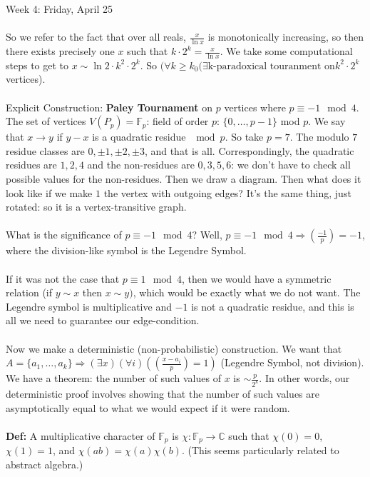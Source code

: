 \documentclass[12pt]{article}
\theoremstyle{remark}
\newcommand{\C}{\mathbb{C}}
\begin{document}
\begin{section}{Week 4: Friday, April 25}
\\\\
So we refer to the fact that over all reals, $\frac{x}{\ln x}$ is monotonically increasing, so then there exists precisely one $x$ such that $k\cdot 2^k = \frac x {\ln x}$. We take some computational steps to get to $x \sim \ln 2 \cdot k^2 \cdot 2^k$. So $(\forall k \geq k_0(\exists\text{k-paradoxical touranment on} k^2\cdot 2^k$ vertices).
\\\\
Explicit Construction: \textbf{Paley Tournament} on $p$ vertices where $p \equiv -1 \mod 4$. The set of vertices $V(P_p) = \mathbb{F}_p$: field of order $p$: $\{0,\ldots,p-1\}$ mod $p$. We say that $x \to y$ if $y-x$ is a quadratic residue $\mod p$. So take $p=7$. The modulo $7$ residue classes are $0, \pm 1, \pm 2, \pm 3$, and that is all. Correspondingly, the quadratic residues are $1,2,4$ and the non-residues are $0,3,5,6$: we don't have to check all possible values for the non-residues. Then we draw a diagram. Then what does it look like if we make $1$ the vertex with outgoing edges? It's the same thing, just rotated: so it is a vertex-transitive graph.
\\\\
What is the significance of $p \equiv -1 \mod 4$? Well, $p \equiv -1 \mod 4 \Rightarrow (\frac{-1}{p}) = -1$, where the division-like symbol is the Legendre Symbol.\\\\
If it was not the case that $p \equiv 1 \mod 4$, then we would have a symmetric relation (if $y \sim x$ then $x \sim y)$, which would be exactly what we do not want. The Legendre symbol is multiplicative and $-1$ is not a quadratic residue, and this is all we need to guarantee our edge-condition.
\\\\
Now we make a deterministic (non-probabilistic) construction. We want that $A = \{a_1,\ldots,a_k\} \Rightarrow (\exists x)(\forall i)((\frac{x-a_i}{p}) =1)$ (Legendre Symbol, not division). We have a theorem: the number of such values of $x$ is $\sim \frac{p}{2^k}$. In other words, our deterministic proof involves showing that the number of such values are asymptotically equal to what we would expect if it were random.
\\\\
\textbf{Def:} A multiplicative character of $\mathbb{F}_p$ is $\chi: \mathbb{F}_p \to \C$ such that $\chi(0) = 0$, $\chi(1) = 1$, and $\chi(ab) = \chi(a)\chi(b)$. (This seems particularly related to abstract algebra.)

\end{section}
\end{document}
